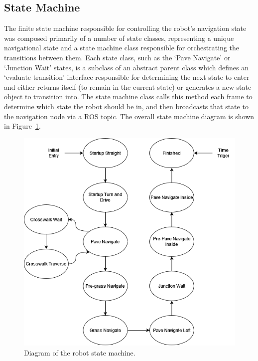 \documentclass[titlepage, twocolumn]{article}
\begin{document}
    \subsection{State Machine}
        The finite state machine responsible for controlling the robot's navigation state was composed primarily of a number of state classes, representing a unique navigational state and a state machine class responsible for orchestrating the transitions between them. Each state class, such as the `Pave Navigate' or `Junction Wait' states, is a subclass of an abstract parent class which defines an `evaluate transition' interface responsible for determining the next state to enter and either returns itself (to remain in the current state) or generates a new state object to transition into. The state machine class calls this method each frame to determine which state the robot should be in, and then broadcasts that state to the navigation node via a ROS topic. The overall state machine diagram is shown in Figure~\ref{fig:statemachine}.

        \begin{figure}
            \includegraphics[width=\linewidth]{statemachine.png}
            \caption{Diagram of the robot state machine.}
            \label{fig:statemachine}
        \end{figure}
\end{document}
